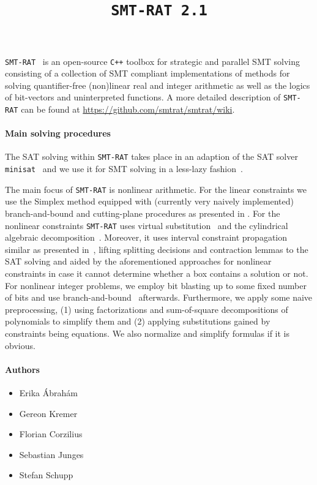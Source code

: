 \documentclass{article}
\title{\texttt{SMT-RAT 2.1}}
\begin{document}
\maketitle

\texttt{SMT-RAT}~\cite{Corzilius2015} is an open-source \texttt{C++} toolbox for strategic and parallel SMT solving
consisting of a collection of SMT compliant implementations of methods for
solving quantifier-free (non)linear real and integer arithmetic as well as
the logics of bit-vectors and uninterpreted functions. A more detailed description of \texttt{SMT-RAT} can be found at \href{https://github.com/smtrat/smtrat/wiki}{\color{blue}https://github.com/smtrat/smtrat/wiki}.

\paragraph{Main solving procedures}

The SAT solving within \texttt{SMT-RAT} takes place in an adaption of the SAT solver \texttt{minisat}~\cite{minisat} and we use it for SMT solving in a less-lazy fashion~\cite{sebastiani2007lazy}.

The main focus of \texttt{SMT-RAT} is nonlinear arithmetic. For the linear constraints we use the Simplex method equipped with (currently very naively implemented) branch-and-bound and cutting-plane procedures as presented in \cite{DM06}. For the nonlinear constraints \texttt{SMT-RAT} uses virtual substitution~\cite{Article_Corzilius_FCT2011} and the cylindrical algebraic decomposition~\cite{Article_Loup_TubeCAD}. Moreover, it uses interval constraint propagation similar as presented in~\cite{GGIGSC10}, lifting splitting decisions and contraction lemmas to the SAT solving and aided by the aforementioned approaches for nonlinear constraints in case it cannot determine whether a box contains a solution or not. For nonlinear integer problems, we employ bit blasting up to some fixed number of bits and use branch-and-bound~\cite{Kremer2016} afterwards.
Furthermore, we apply some naive preprocessing, (1) using factorizations and sum-of-square decompositions of polynomials to simplify them and (2) applying substitutions gained by constraints being equations. We also normalize and simplify formulas if it is obvious.

\paragraph{Authors}
\begin{itemize}
\item Erika \'Abrah\'am
\item Gereon Kremer
\item Florian Corzilius
\item Sebastian Junges
\item Stefan Schupp
\end{itemize}


  
\end{document}
